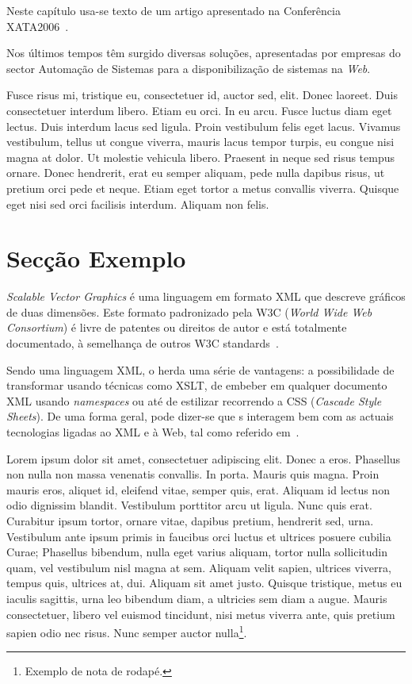Neste capítulo usa-se texto de um artigo apresentado na Conferência
XATA2006~\citep{kn:MVL06-xata}.

Nos últimos tempos têm surgido diversas soluções, apresentadas por
empresas do sector Auto\-ma\-ção de Sistemas para a disponibilização de
sistemas \scadadms{} na \textit{Web}.

Fusce risus mi, tristique eu, consectetuer id, auctor sed, elit. Donec
laoreet. Duis consectetuer interdum libero. Etiam eu orci. In eu
arcu. Fusce luctus diam eget lectus. Duis interdum lacus sed
ligula. Proin vestibulum felis eget lacus. Vivamus vestibulum, tellus
ut congue viverra, mauris lacus tempor turpis, eu congue nisi magna at
dolor. Ut molestie vehicula libero. Praesent in neque sed risus tempus
ornare. Donec hendrerit, erat eu semper aliquam, pede nulla dapibus
risus, ut pretium orci pede et neque.
Etiam eget tortor a metus convallis viverra. Quisque eget nisi sed
orci facilisis interdum. Aliquam non felis. 

\section{Secção Exemplo}\label{sec:dialecto}

\emph{Scalable Vector Graphics} é uma
linguagem em formato XML que descreve gráficos de duas dimensões. 
Este formato padronizado pela W3C (\emph{World Wide Web Consortium})
é livre de patentes ou direitos de autor e está totalmente
documentado, à semelhança de outros W3C
standards~\citep{kn:svgdoc}.

Sendo uma linguagem XML, o \svg{} herda uma série de vantagens: a
possibilidade de transformar \svg{} usando técnicas como
XSLT, de embeber \svg{} em qualquer documento
XML usando \textit{namespaces} ou até de  
estilizar \svg{} recorrendo a CSS (\emph{Cascade Style Sheets}). 
De uma forma geral, pode dizer-se que \svg{}s interagem bem com as
actuais tecnologias ligadas ao XML e à Web, tal como referido
em~\citep{kn:svgibm,kn:svgw3c}.

Lorem ipsum dolor sit amet, consectetuer adipiscing elit. Donec a
eros. Phasellus non nulla non massa venenatis convallis. In
porta. Mauris quis magna. Proin mauris eros, aliquet id, eleifend
vitae, semper quis, erat. Aliquam id lectus non odio dignissim
blandit. Vestibulum porttitor arcu ut ligula. Nunc quis
erat. Curabitur ipsum tortor, ornare vitae, dapibus pretium, hendrerit
sed, urna. Vestibulum ante ipsum primis in faucibus orci luctus et
ultrices posuere cubilia Curae; Phasellus bibendum, nulla eget varius
aliquam, tortor nulla sollicitudin quam, vel vestibulum nisl magna at
sem. Aliquam velit sapien, ultrices viverra, tempus quis, ultrices at,
dui. Aliquam sit amet justo. Quisque tristique, metus eu iaculis
sagittis, urna leo bibendum diam, a ultricies sem diam a augue. Mauris
consectetuer, libero vel euismod tincidunt, nisi metus viverra ante,
quis pretium sapien odio nec risus. Nunc semper auctor
nulla\footnote{Exemplo de nota de rodapé.}. 

